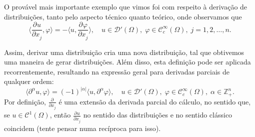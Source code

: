 \documentclass[../distribution_theory_notes.tex]{subfiles}
\begin{document}
O provável mais importante exemplo que vimos foi com respeito à derivação de distribuições, tanto pelo aspecto técnico quanto teórico, onde observamos que
\[
	\biggl\langle \frac{\partial^{}u}{\partial x_{j}^{}}, \varphi  \biggr\rangle =-\biggl\langle u, \frac{\partial^{}\varphi }{\partial x_{j}^{}} \biggr\rangle,\quad u\in \mathcal{D}'(\Omega ),\; \varphi \in \mathcal{C}_{c}^{\infty}(\Omega ),\; j=1,2,\dotsc ,n.
\]

Assim, derivar uma distribuição cria uma nova distribuição, tal que obtivemos uma maneira de gerar distribuições. Além disso, esta definição pode ser aplicada recorrentemente, resultando na expressão geral para derivadas parciais de qualquer ordem:
\[
	\langle \partial^{\alpha }u, \varphi  \rangle= (-1)^{| \alpha  |}\langle u, \partial^{\alpha }\varphi  \rangle,\quad u\in \mathcal{D}'(\Omega ),\; \varphi\in \mathcal{C}_{c}^{\infty}(\Omega ),\; \alpha \in \mathbb{Z}_{+}^{n}.
\]
Por definição, \(\frac{\partial^{}}{\partial x_{j}^{}} \) é uma extensão da derivada parcial do cálculo, no sentido que, se \(u\in \mathcal{C}^{1}(\Omega )\), então \(\frac{\partial^{}u}{\partial x_{j}^{}} \) no sentido das distribuições e no sentido clássico coincidem (tente pensar numa recíproca para isso).
\end{document}
